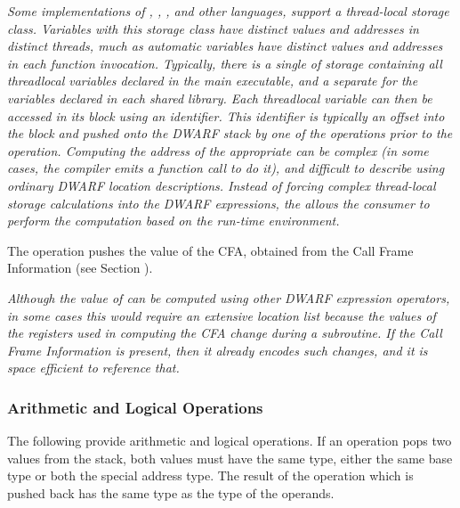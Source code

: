 \begin{enumerate}[1. ]
\textit{Some implementations of 
, , , and other 
languages, support a 
thread-local storage class. Variables with this storage class
have distinct values and addresses in distinct threads, much
as automatic variables have distinct values and addresses in
each function invocation. Typically, there is a single 
of storage containing all thread\dash local variables declared in
the main executable, and a separate  for the variables
declared in each shared library. Each 
thread\dash local variable can then be accessed in its block using an
identifier. This identifier is typically an offset into the block and 
pushed onto the DWARF stack by one of the 
\DWOPconstnx{} operations prior to the
\DWOPformtlsaddress{} operation. 
Computing the address of
the appropriate  can be complex (in some cases, the
compiler emits a function call to do it), and difficult
to describe using ordinary DWARF location descriptions.
Instead of    forcing complex thread-local storage calculations into 
the DWARF expressions, the \DWOPformtlsaddress{} allows the consumer 
to perform the computation based on the run-time environment.}

\itembfnl{\DWOPcallframecfaTARG}
The \DWOPcallframecfaNAME{} 
operation pushes the value of the
CFA, obtained from the Call Frame Information 
(see Section ).

\textit{Although the value of \DWATframebase{}
can be computed using other DWARF expression operators,
in some cases this would require an extensive location list
because the values of the registers used in computing the
CFA change during a subroutine. If the 
Call Frame Information 
is present, then it already encodes such changes, and it is
space efficient to reference that.}
\end{enumerate}

\subsubsection{Arithmetic and Logical Operations} 
The following provide arithmetic and logical operations.  If an operation
pops two values from the stack, both values must have the same type,
either the same base type or both the special address type.
The result of the operation which is pushed back has the same type
as the type of the operands.  

